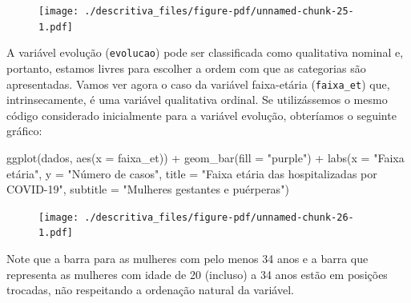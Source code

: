 \documentclass[
  letterpaper,
  DIV=11,
  numbers=noendperiod]{scrreprt}
\newenvironment{Shaded}{\begin{snugshade}}{\end{snugshade}}
\newcommand{\AttributeTok}[1]{\textcolor[rgb]{0.40,0.45,0.13}{#1}}
\newcommand{\FunctionTok}[1]{\textcolor[rgb]{0.28,0.35,0.67}{#1}}
\newcommand{\NormalTok}[1]{\textcolor[rgb]{0.00,0.23,0.31}{#1}}
\newcommand{\SpecialCharTok}[1]{\textcolor[rgb]{0.37,0.37,0.37}{#1}}
\newcommand{\StringTok}[1]{\textcolor[rgb]{0.13,0.47,0.30}{#1}}
\begin{document}
\begin{figure}[H]

{\centering \texttt{[image: ./descritiva\_files/figure-pdf/unnamed-chunk-25-1.pdf]}

}

\end{figure}

A variável evolução (\texttt{evolucao}) pode ser classificada como
qualitativa nominal e, portanto, estamos livres para escolher a ordem
com que as categorias são apresentadas. Vamos ver agora o caso da
variável faixa-etária (\texttt{faixa\_et}) que, intrinsecamente, é uma
variável qualitativa ordinal. Se utilizássemos o mesmo código
considerado inicialmente para a variável evolução, obteríamos o seguinte
gráfico:

\begin{Shaded}
\begin{Highlighting}[]
\FunctionTok{ggplot}\NormalTok{(dados, }\FunctionTok{aes}\NormalTok{(}\AttributeTok{x =}\NormalTok{ faixa\_et)) }\SpecialCharTok{+}
  \FunctionTok{geom\_bar}\NormalTok{(}\AttributeTok{fill =} \StringTok{"purple"}\NormalTok{) }\SpecialCharTok{+}
  \FunctionTok{labs}\NormalTok{(}\AttributeTok{x =} \StringTok{"Faixa etária"}\NormalTok{, }\AttributeTok{y =} \StringTok{"Número de casos"}\NormalTok{, }\AttributeTok{title =} \StringTok{"Faixa etária das hospitalizadas por COVID{-}19"}\NormalTok{, }\AttributeTok{subtitle =} \StringTok{"Mulheres gestantes e puérperas"}\NormalTok{)}
\end{Highlighting}
\end{Shaded}

\begin{figure}[H]

{\centering \texttt{[image: ./descritiva\_files/figure-pdf/unnamed-chunk-26-1.pdf]}

}

\end{figure}

Note que a barra para as mulheres com pelo menos 34 anos e a barra que
representa as mulheres com idade de 20 (incluso) a 34 anos estão em
posições trocadas, não respeitando a ordenação natural da variável.
\end{document}
